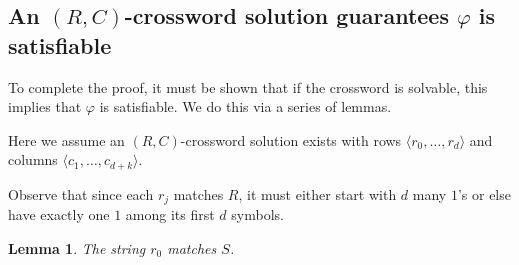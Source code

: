 \documentclass{article}
\newcommand{\0}{\mathbf{0}}
\newcommand{\1}{\mathbf{1}}
\newcommand{\2}{\mathbf{2}}
\renewcommand{\p}{\varphi}
\newcommand{\tup}[1]{\langle{} #1 \rangle{}}
\newcounter{row}
\newcounter{col}
\theoremstyle{plain}
\newtheorem{lemma}[theorem]{Lemma}
\theoremstyle{definition}
\begin{document}
\subsection{An \texorpdfstring{$(R, C)$}{(R,C)}-crossword solution guarantees \texorpdfstring{$\p$}{phi} is satisfiable}
To complete the proof, it must be shown that if the crossword is solvable, this implies that $\p$ is satisfiable.  We do this via a series of lemmas.

Here we assume an $(R, C)$-crossword solution exists with rows $\tup{r_0, \ldots, r_d}$ and columns $\tup{c_1, \ldots, c_{d+k}}$.

Observe that since each $r_j$ matches $R$, it must either start with $d$ many $1$'s or else have exactly one $1$ among its first $d$ symbols.

\begin{lemma}\label{lemma:spinelemma}\rm
  The string $r_0$ matches $S$.
\end{lemma}
\end{document}
